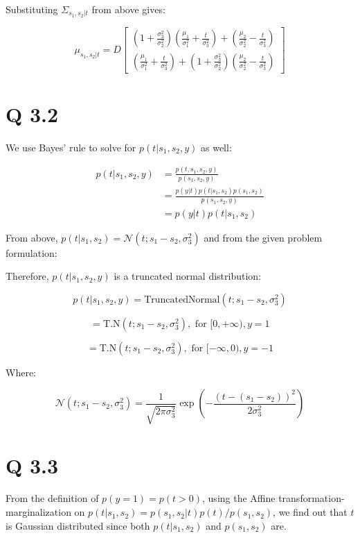 Substituting $\Sigma_{s_1, s_2|t}$ from above gives:

\[
\mu_{s_1, s_2|t} = D \begin{bmatrix} \left( 1 + \frac{\sigma_3^2}{\sigma_2^2} \right) \left( \frac{\mu_1}{\sigma_1^2} + \frac{t}{\sigma_3^2} \right) + \left( \frac{\mu_2}{\sigma_2^2} - \frac{t}{\sigma_3^2} \right) \\ \left( \frac{\mu_1}{\sigma_1^2} + \frac{t}{\sigma_3^2} \right) + \left( 1 + \frac{\sigma_3^2}{\sigma_2^2} \right) \left( \frac{\mu_2}{\sigma_2^2} - \frac{t}{\sigma_3^2} \right) \end{bmatrix}
\]

\section*{Q 3.2}
We use Bayes' rule to solve for $p(t|s_1, s_2, y)$ as well:

\begin{align*}
    p(t|s_1, s_2, y) &= \frac{p(t, s_1, s_2, y)}{p(s_1, s_2, y)} \\
    &= \frac{p(y|t) p(t|s_1, s_2) p(s_1, s_2)}{p(s_1, s_2, y)} \\
    &= p(y|t) p(t|s_1, s_2)
\end{align*}

From above, $p(t|s_1, s_2) = \mathcal{N}\left(t; s_1 - s_2, \sigma_3^2\right)$ and from the given problem formulation:

Therefore, $p(t|s_1, s_2, y)$ is a truncated normal distribution:

\[
p(t|s_1, s_2, y) = \text{TruncatedNormal}(t; s_1 - s_2, \sigma_3^2)
\]

\[
= \text{T.N}\left(t; s_1 - s_2, \sigma_3^2\right), \text{ for } [0, +\infty), y = 1
\]

\[
= \text{T.N}\left(t; s_1 - s_2, \sigma_3^2\right), \text{ for } [-\infty, 0), y = -1
\]

Where:

\[
\mathcal{N}\left(t; s_1 - s_2, \sigma_3^2\right) = \frac{1}{\sqrt{2\pi\sigma_3^2}} \exp\left( -\frac{(t - (s_1 - s_2))^2}{2\sigma_3^2} \right)
\]

\section*{Q 3.3}
From the definition of $p(y = 1) = p(t > 0)$, using the Affine transformation-marginalization on $p(t|s_1, s_2) = p(s_1, s_2|t) p(t) / p(s_1, s_2)$, we find out that $t$ is Gaussian distributed since both $p(t|s_1, s_2)$ and $p(s_1, s_2)$ are.

